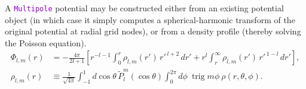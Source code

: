 \documentclass[12pt]{article}
\newcommand{\ttt}[1]{\textcolor{darkviolet}{\texttt{#1}}}
\DeclareMathOperator{\trig}{trig}
\begin{document}
A \ttt{Multipole} potential may be constructed either from an existing potential object (in which case it simply computes a spherical-harmonic transform of the original potential at radial grid nodes), or from a density profile (thereby solving the Poisson equation).
\begin{align}
\Phi_{l,m}(r) &= -\frac{4\pi}{2l+1} \left[ r^{-l-1} \int_0^r \rho_{l,m}(r')\,{r'}^{\,l+2}\,dr' + r^l\int_r^\infty \rho_{l,m}(r')\,{r'}^{\,1-l}\,dr' \right],  \label{eq:SphHarmPoisson} \\
\rho_{l,m}(r) &\equiv \frac{1}{\sqrt{4\pi}} \int_{-1}^1 d\cos\theta\, \tilde P_l^m(\cos\theta) \int_0^{2\pi}d\phi\:\trig m\phi\:\rho(r,\theta,\phi) .  \label{eq:SphHarmDensity}
\end{align}
\end{document}
